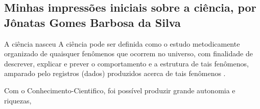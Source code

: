 \subsection{Minhas impressões iniciais sobre a ciência, por Jônatas Gomes Barbosa da Silva}

A ciência nasceu 
A ciência pode ser definida como o estudo metodicamente organizado de
quaisquer fenômenos que ocorrem no universo, com finalidade de descrever,
explicar e prever o comportamento e a estrutura de tais fenômenos, amparado
pelo registros (dados) produzidos acerca de tais fenômenos \citep{fernandes_ciencia_2018}. 

Com o \gls{Conhecimento-Cientifico}, foi possível produzir grande autonomia e riquezas,